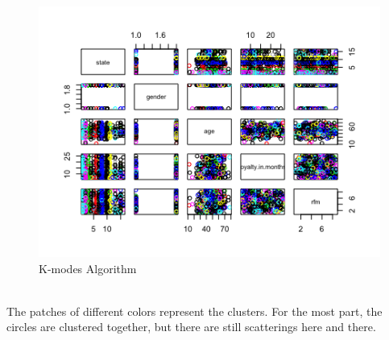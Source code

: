 \documentclass[a4paper,12pt,fleqn]{article}
\begin{document}
\begin{figure}[h]
	\centering
	\includegraphics[width=0.75\linewidth]{"15.K-modes algorithm"}
	\caption{K-modes Algorithm}
	\label{fig:15}
\end{figure}\\
The patches of different colors represent the clusters. For the most part, the circles are clustered together, but there are still scatterings here and there. \\
\end{document}
